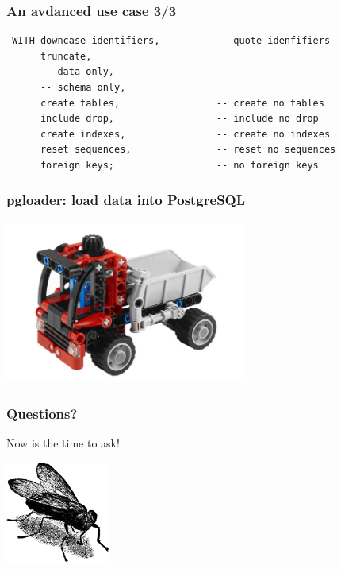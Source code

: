 \documentclass{beamer}
\begin{document}
\begin{frame}[fragile]
  \frametitle{An avdanced use case 3/3}

\begin{verbatim}
 WITH downcase identifiers,          -- quote idenfifiers
      truncate,
      -- data only,
      -- schema only,
      create tables,                 -- create no tables
      include drop,                  -- include no drop
      create indexes,                -- create no indexes
      reset sequences,               -- reset no sequences
      foreign keys;                  -- no foreign keys
\end{verbatim}
\end{frame}

\begin{frame}
  \frametitle{pgloader: load data into PostgreSQL}


  \begin{center}
    \includegraphics[height=2.1in]{pgloader.jpg}
  \end{center}
\end{frame}

\begin{frame}
  \frametitle{Questions?}

  \begin{center}
    Now is the time to ask!
    \vfill

    \includegraphics[height=9em]{fly.png}
  \end{center}
\end{frame}
\end{document}
